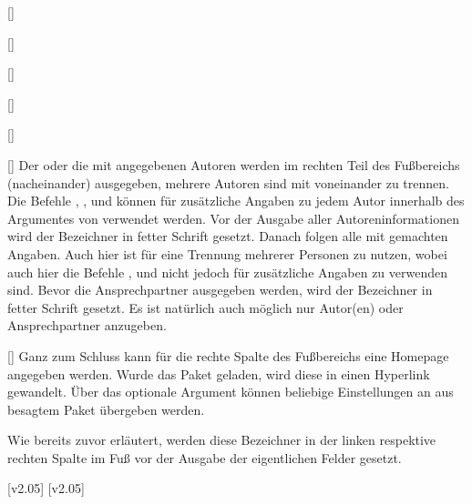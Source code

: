 \begin{Bundle*}[v2.05]{}
\begin{Declaration}{[]}
\begin{Declaration}{[]}
\begin{Declaration}{[]}
\begin{Declaration}{[]}
\begin{Declaration}{[]}
\begin{Declaration}{[]}
\printdeclarationlist%
%
Der oder die mit  angegebenen Autoren werden im rechten Teil des 
Fußbereichs (nacheinander) ausgegeben, mehrere Autoren sind mit  
voneinander zu trennen. Die Befehle , , 
 und  können für zusätzliche Angaben zu 
jedem Autor innerhalb des Argumentes von  verwendet werden. Vor 
der Ausgabe aller Autoreninformationen wird der Bezeichner  in 
fetter Schrift gesetzt. Danach folgen alle mit  gemachten 
Angaben. Auch hier ist  für eine Trennung mehrerer Personen zu 
nutzen, wobei auch hier die Befehle ,  und 
 nicht jedoch  für zusätzliche Angaben 
zu verwenden sind. Bevor die Ansprechpartner ausgegeben werden, wird der 
Bezeichner  in fetter Schrift gesetzt. Es ist natürlich 
auch möglich nur Autor(en) oder Ansprechpartner anzugeben.
\end{Declaration}
\end{Declaration}
\end{Declaration}
\end{Declaration}
\end{Declaration}
\end{Declaration}

\begin{Declaration}{[]}
\printdeclarationlist%
%
Ganz zum Schluss kann für die rechte Spalte des Fußbereichs eine Homepage 
angegeben werden. Wurde das Paket  geladen, wird diese in 
einen Hyperlink gewandelt. Über das optionale Argument können beliebige 
Einstellungen an  aus besagtem Paket übergeben werden.
\end{Declaration}

\begin{Declaration}{}
\begin{Declaration}{}
\begin{Declaration}{}
\printdeclarationlist%
%
Wie bereits zuvor erläutert, werden diese Bezeichner in der linken respektive 
rechten Spalte im Fuß vor der Ausgabe der eigentlichen Felder gesetzt.
\end{Declaration}
\end{Declaration}
\end{Declaration}

[v2.05]
[v2.05]
\end{Bundle*}

